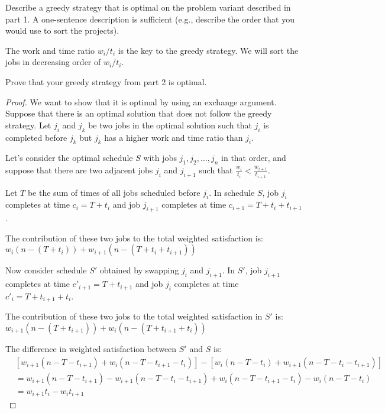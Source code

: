 \documentclass[11pt,fleqn]{exam}
\newenvironment{soln}{\color{solnblue}}{}
\newif\ifsolutions\solutionsfalse
\begin{document}
\begin{questions}
    \question[2] Describe a greedy strategy that is optimal on the problem variant described in part 1. A one-sentence description is sufficient (e.g., describe the order that you would use to sort the projects).
     \ifsolutions  \fi

     \begin{soln}
        The work and time ratio $w_i/t_i$ is the key to the greedy strategy. We will sort the jobs in decreasing order of $w_i/t_i$.
     \end{soln}

    \question[5] Prove that your greedy strategy from part 2 is optimal.
     \ifsolutions  \else \newpage \fi
     \begin{soln}
        \begin{proof}
            We want to show that it is optimal by using an exchange argument. 
            Suppose that there is an optimal solution that does not follow the greedy strategy. 
            Let $j_i$ and $j_k$ be two jobs in the optimal solution such that $j_i$ is completed 
            before $j_k$ but $j_k$ has a higher work and time ratio than $j_i$. 

            Let's consider the optimal schedule $S$ with jobs $j_1, j_2, \ldots, j_n$ in that order, and suppose that there are two adjacent jobs $j_i$ and $j_{i+1}$ such that $\frac{w_i}{t_i} < \frac{w_{i+1}}{t_{i+1}}$. 

            Let $T$ be the sum of times of all jobs scheduled before $j_i$. In schedule $S$, job $j_i$ completes at time $c_i = T + t_i$ and job $j_{i+1}$ completes at time $c_{i+1} = T + t_i + t_{i+1}$. 
            
            The contribution of these two jobs to the total weighted satisfaction is:
            $w_i(n-(T+t_i)) + w_{i+1}(n-(T+t_i+t_{i+1}))$
            
            Now consider schedule $S'$ obtained by swapping $j_i$ and $j_{i+1}$. In $S'$, job $j_{i+1}$ completes at time $c'_{i+1} = T + t_{i+1}$ and job $j_i$ completes at time $c'_i = T + t_{i+1} + t_i$.
            
            The contribution of these two jobs to the total weighted satisfaction in $S'$ is:
            $w_{i+1}(n-(T+t_{i+1})) + w_i(n-(T+t_{i+1}+t_i))$
            
            The difference in weighted satisfaction between $S'$ and $S$ is:
            \begin{align}
            &[w_{i+1}(n-T-t_{i+1}) + w_i(n-T-t_{i+1}-t_i)] - [w_i(n-T-t_i) + w_{i+1}(n-T-t_i-t_{i+1})]\\
            &= w_{i+1}(n-T-t_{i+1}) - w_{i+1}(n-T-t_i-t_{i+1}) + w_i(n-T-t_{i+1}-t_i) - w_i(n-T-t_i)\\
            &= w_{i+1}t_i - w_it_{i+1}
            \end{align}
            

\end{proof}
\end{soln}
\end{questions}
\end{document}
